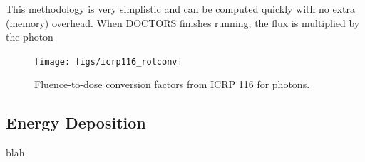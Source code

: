 This methodology is very simplistic and can be computed quickly with no extra (memory) overhead. When DOCTORS finishes running, the flux is multiplied by the photon 

\begin{figure}[tb]
  \begin{center}
   \texttt{[image: figs/icrp116\_rotconv]}
  \end{center}
  \caption{Fluence-to-dose conversion factors from ICRP 116 for photons.}
\label{fig:icrp116_rotconv}
\end{figure}

\subsection{Energy Deposition}

blah

\endinput
